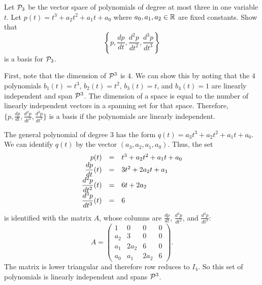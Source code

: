 \documentclass{ximera}
\begin{document}
\begin{exercise} \label{c5.5.6}
Let ${\cal P}_3$ be the vector space of polynomials of degree at
most three in one variable $t$.  Let $p(t)=t^3+a_2t^2+a_1t+a_0$ where
$a_0,a_1,a_2\in\mbox{$\Bbb{R}$}$ are fixed constants.  Show that
\[
\left\{ p, \frac{dp}{dt}, \frac{d^2p}{dt^2}, \frac{d^3p}{dt^3}\right\}
\]
is a basis for ${\cal P}_3$.

\begin{solution}

First, note that the dimension of ${\cal P}^3$ is $4$.  We can show
this by noting that the $4$ polynomials $b_1(t) = t^3$, $b_2(t) =
t^2$, $b_3(t) = t$, and $b_4(t) = 1$ are linearly independent and
span ${\cal P}^3$.  The dimension of a space is equal to the number of
linearly independent vectors in a spanning set for that space.
Therefore, $\{p, \frac{dp}{dt}, \frac{d^2p}{dt^2}, \frac{d^3p}{dt^3}\}$
is a basis if the polynomials are linearly independent.

\para The general polynomial of degree $3$ has the form $q(t) =
a_3t^3 + a_2t^2 + a_1t + a_0$.  We can identify $q(t)$ by the vector 
$(a_3,a_2,a_1,a_0)$.  Thus, the set
\[
\begin{array}{rcl}
\displaystyle p(t) & = & t^3 + a_2t^2 + a_1t + a_0 \\
\displaystyle \frac{dp}{dt}(t) & = & 3t^2 + 2a_2t + a_1 \\
\displaystyle \frac{d^2p}{dt^2}(t) & = & 6t + 2a_2 \\
\displaystyle \frac{d^3p}{dt^3}(t) & = & 6 \end{array}
\]
is identified with the matrix $A$, whose columns are 
$\frac{dp}{dt}$, $\frac{d^2p}{dt^2}$, and $\frac{d^3p}{dt^3}$:
\[ A = \left(\begin{array}{cccc} 1 & 0 & 0 & 0 \\
a_2 & 3 & 0 & 0 \\ a_1 & 2a_2 & 6 & 0 \\ a_0 & a_1 & 2a_2 & 6
\end{array}\right). \]
The matrix is lower triangular and therefore row reduces to $I_4$.  So
this set of polynomials is linearly independent and spans ${\cal P}^3$.

\end{solution}
\end{exercise}
\end{document}
